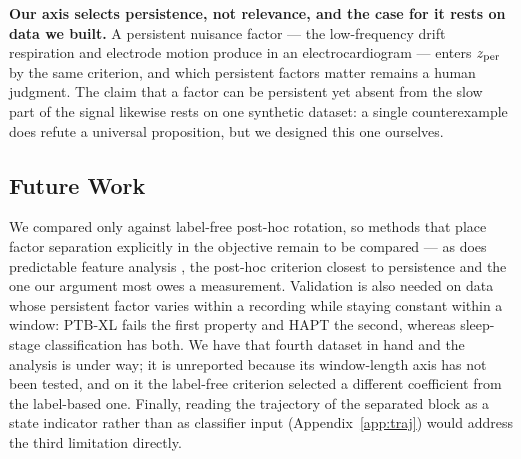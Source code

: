 \textbf{Our axis selects persistence, not relevance, and the case for it rests on data we built.} A persistent nuisance factor --- the low-frequency drift respiration and electrode motion produce in an electrocardiogram --- enters $z_{\mathrm{per}}$ by the same criterion, and which persistent factors matter remains a human judgment. The claim that a factor can be persistent yet absent from the slow part of the signal likewise rests on one synthetic dataset: a single counterexample does refute a universal proposition, but we designed this one ourselves.

\subsection{Future Work}

We compared only against label-free post-hoc rotation, so methods that place factor separation explicitly in the objective remain to be compared --- as does predictable feature analysis \citep{richthofer2013}, the post-hoc criterion closest to persistence and the one our argument most owes a measurement. Validation is also needed on data whose persistent factor varies within a recording while staying constant within a window: PTB-XL fails the first property and HAPT the second, whereas sleep-stage classification has both. We have that fourth dataset in hand and the analysis is under way; it is unreported because its window-length axis has not been tested, and on it the label-free criterion selected a different coefficient from the label-based one. Finally, reading the trajectory of the separated block as a state indicator rather than as classifier input (Appendix~\ref{app:traj}) would address the third limitation directly.
